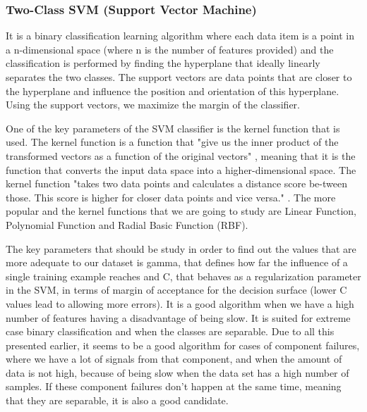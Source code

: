 \subsubsection{Two-Class SVM (Support Vector Machine)}
It is a binary classification learning algorithm where each data item is a point in a n-dimensional space (where n is the number of features provided) and the classification is performed by finding the hyperplane that ideally linearly separates the two classes. The support vectors are data points that are closer to the hyperplane and influence the position and orientation of this hyperplane. Using the support vectors, we maximize the margin of the classifier. \cite{SVM}

One of the key parameters of the SVM classifier is the kernel function that is used. The kernel function is a function that "give us the inner product of the transformed vectors as a function of the original vectors" \cite{FCT_AA}, meaning that it is the function that converts the input data space into a higher-dimensional space. The kernel function "takes two data points and calculates a distance score be-tween those. This score is higher for closer data points and vice versa." \cite{SVM}. The more popular and the kernel functions that we are going to study are Linear Function, Polynomial Function and Radial Basic Function (RBF).

The key parameters that should be study in order to find out the values that are more adequate to our dataset is gamma, that defines how far the influence of a single training example reaches and C, that behaves as a regularization parameter in the SVM, in terms of margin of acceptance for the decision surface (lower C values lead to allowing more errors).
It is a good algorithm when we have a high number of features having a disadvantage of being slow. It is suited for extreme case binary classification and when the classes are separable.
Due to all this presented earlier, it seems to be a good algorithm for cases of component failures, where we have a lot of signals from that component, and when the amount of data is not high, because of being slow when the data set has a high number of samples. If these component failures don't happen at the same time, meaning that they are separable, it is also a good candidate.

